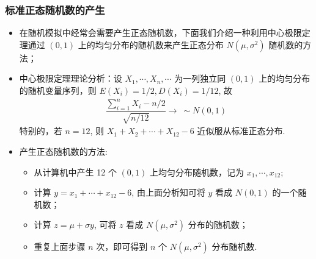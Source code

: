 \documentclass[Prob-All.tex]{subfiles}
\begin{document}
\begin{frame}
	\frametitle{标准正态随机数的产生}
	\begin{itemize}[<+-|alert@+>]
		\item 在随机模拟中经常会需要产生正态随机数，下面我们介绍一种利用中心极限定理通过 $(0,1)$ 上的均匀分布的随机数来产生正态分布 $N (\mu,\sigma^2)$ 随机数的方法；
		\item 中心极限定理理论分析：设 $X_1,\cdots,X_n,\cdots$ 为一列独立同 $(0,1)$ 上的均匀分布的随机变量序列，则 $E (X_i)=1/2, D (X_i)=1/12$, 故
		\begin{eqnarray*}
			\dfrac{\sum_{i=1}^nX_i-n/2}{\sqrt{n/12}}\rightarrow~ \sim N(0,1)
		\end{eqnarray*}
		特别的，若 $n=12$, 则 $X_1+X_2+\cdots+X_{12}-6$ 近似服从标准正态分布.
		\item 产生正态随机数的方法:
		\begin{itemize}
			\item 从计算机中产生 12 个 $(0,1)$ 上均匀分布随机数，记为 $x_1,\cdots, x_{12}$;
			\item 计算 $y=x_1+\cdots+x_{12}-6$, 由上面分析知可将 $y$ 看成 $N (0,1)$ 的一个随机数；
			\item 计算 $z=\mu+\sigma y$, 可将 $z$ 看成 $N (\mu,\sigma^2)$ 分布的随机数；
			\item 重复上面步骤 $n$ 次，即可得到 $n$ 个 $N (\mu,\sigma^2)$ 分布随机数.
		\end{itemize}

	\end{itemize}
\end{frame}
\end{document}
